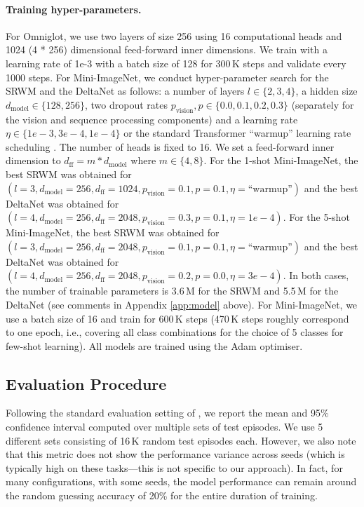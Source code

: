 \documentclass[nohyperref]{article}
\theoremstyle{plain}
\theoremstyle{definition}
\theoremstyle{remark}
\begin{document}
\paragraph{Training hyper-parameters.}
For Omniglot, we use two layers of size 256 using 16 computational heads and 1024 (4 * 256) dimensional feed-forward inner dimensions. We train with a learning rate of 1e-3 with a batch size of 128 for 300\,K steps and validate every 1000 steps.
For Mini-ImageNet,
we conduct hyper-parameter search for the SRWM and the DeltaNet as follows: a number of layers $l \in \{2, 3, 4\}$, a hidden size $d_\text{model} \in \{128, 256\}$,
two dropout rates $p_\text{vision}, p \in \{0.0, 0.1, 0.2, 0.3\}$ (separately for the vision and sequence processing components) and a learning rate $\eta \in \{1e-3, 3e-4, 1e-4\}$ or the standard Transformer ``warmup'' learning rate scheduling \citep{trafo}.
The number of heads is fixed to 16.
We set a feed-forward inner dimension to $d_\text{ff} = m * d_\text{model}$ where $m \in \{4, 8\}$.
For the 1-shot Mini-ImageNet, the best SRWM was obtained for $(l=3, d_\text{model}=256, d_\text{ff}=1024, p_\text{vision}=0.1, p=0.1, \eta=\text{``warmup''})$ and the best DeltaNet was obtained for $(l=4, d_\text{model}=256, d_\text{ff}=2048, p_\text{vision}=0.3, p=0.1, \eta=1e-4)$.
For the 5-shot Mini-ImageNet, the best SRWM was obtained for $(l=3, d_\text{model}=256, d_\text{ff}=2048, p_\text{vision}=0.1, p=0.1, \eta=\text{``warmup''})$ and the best DeltaNet was obtained for $(l=4, d_\text{model}=256, d_\text{ff}=2048, p_\text{vision}=0.2, p=0.0, \eta=3e-4)$.
In both cases, the number of trainable parameters is 3.6\,M for the SRWM and 5.5\,M for the DeltaNet (see comments in Appendix \ref{app:model} above).
For Mini-ImageNet, we use a batch size of 16
and train for 600\,K steps (470\,K steps roughly correspond to one epoch, i.e., covering all class combinations for the choice of 5 classes for few-shot learning).
All models are trained using the Adam optimiser.


\subsection{Evaluation Procedure}
Following the standard evaluation setting of \citet{RaviL17}, we report the mean and 95\% confidence interval computed over multiple sets of test episodes.
We use 5 different sets consisting of 16\,K random test episodes each.
However, we also note that this metric does not show the performance
variance across seeds (which is typically high on these tasks---this is not specific to our approach).
In fact, for many configurations, with some seeds, the model performance can remain around the random guessing accuracy of 20\% for the entire duration of training.
\end{document}
